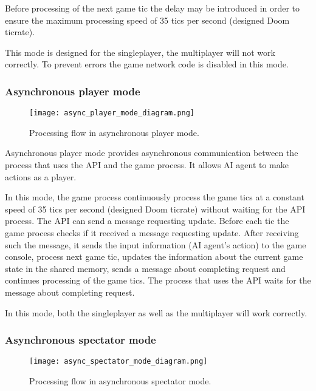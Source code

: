         Before processing of the next game tic the delay may be introduced in order to ensure the maximum processing speed of 35 tics per second (designed Doom ticrate).
        
        This mode is designed for the singleplayer, the multiplayer will not work correctly. To prevent errors the game network code is disabled in this mode.

    \subsubsection{Asynchronous player mode}\label{sec:architecture_async_player_mode}

	    \begin{figure}
			    \centering
			    \texttt{[image: async\_player\_mode\_diagram.png]}
			    \caption{Processing flow in asynchronous player mode.}\label{fig:async_player_mode_diagram}
	    \end{figure}
	    
	    Asynchronous player mode provides asynchronous communication between the process that uses the API and the game process. It allows AI agent to make actions as a player. 
	    
	    In this mode, the game process continuously process the game tics at a constant speed of 35 tics per second (designed Doom ticrate) without waiting for the API process. The API can send a message requesting update. Before each tic the game process checks if it received a message requesting update. After receiving such the message, it sends the input information (AI agent's action) to the game console, process next game tic, updates the information about the current game state in the shared memory, sends a message about completing request and continues processing of the game tics. The process that uses the API waits for the message about completing request.
	    
	    In this mode, both the singleplayer as well as the multiplayer will work correctly.

    \subsubsection{Asynchronous spectator mode}\label{sec:architecture_async_spectator_mode}

	    \begin{figure}
			    \centering
			    \texttt{[image: async\_spectator\_mode\_diagram.png]}
			    \caption{Processing flow in asynchronous spectator mode.}\label{fig:async_spectator_mode_diagram}
	    \end{figure}
	    
